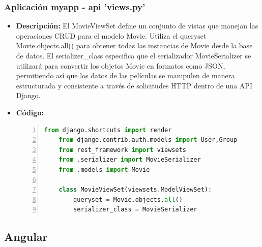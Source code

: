 \documentclass{article}
\begin{document}
  \subsubsection{Aplicación myapp - api 'views.py'}
  \begin{itemize}
    \item \textbf{Descripción: }El MovieViewSet define un conjunto de vistas que manejan las 
    operaciones CRUD para el modelo Movie. Utiliza el queryset Movie.objects.all() para obtener 
    todas las instancias de Movie desde la base de datos. El serializer\_class especifica que el 
    serializador MovieSerializer se utilizará para convertir los objetos Movie en formatos como 
    JSON, permitiendo así que los datos de las películas se manipulen de manera estructurada y 
    consistente a través de solicitudes HTTP dentro de una API Django.
    \newpage
    \item \textbf{Código: }
    \begin{lstlisting}[language=python, numbers=left, firstnumber=1, numberstyle=\color{blue}]
    from django.shortcuts import render
    from django.contrib.auth.models import User,Group
    from rest_framework import viewsets
    from .serializer import MovieSerializer
    from .models import Movie

    class MovieViewSet(viewsets.ModelViewSet):
        queryset = Movie.objects.all()
        serializer_class = MovieSerializer
    \end{lstlisting}
  \end{itemize}
  
  \subsection{Angular}
\end{document}

